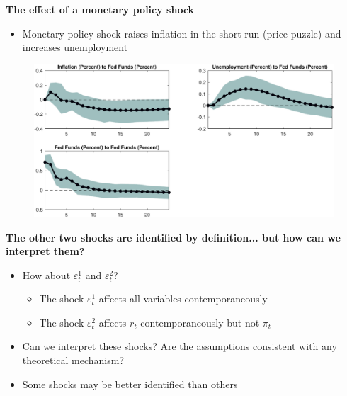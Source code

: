
\begin{frame}
{\textbf{The effect of a monetary policy shock}}

\begin{itemize}
\item Monetary policy shock raises inflation in the short run (price puzzle)
and increases unemployment
\end{itemize}

\begin{figure}[h]
\centering\includegraphics[width=.75\textwidth]{SW_IR_3.pdf}
\end{figure}
\end{frame}


\begin{frame}
{\textbf{The other two shocks are identified by definition... but how can we
interpret them?}}\bigskip\bigskip

\begin{itemize}
\item How about $\varepsilon^{1}_{t}$ and $\varepsilon^2_{t}$? \smallskip

\begin{itemize}
\item The shock $\varepsilon^{1}_{t}$ affects all variables
contemporaneously\medskip

\item The shock $\varepsilon^2_{t}$ affects $r_{t}$ contemporaneously but
not $\pi _{t}$\pause\bigskip
\end{itemize}

\item Can we interpret these shocks? Are the assumptions consistent with any
theoretical mechanism? \pause\bigskip

\item Some shocks may be better identified than others
\end{itemize}
\end{frame}

